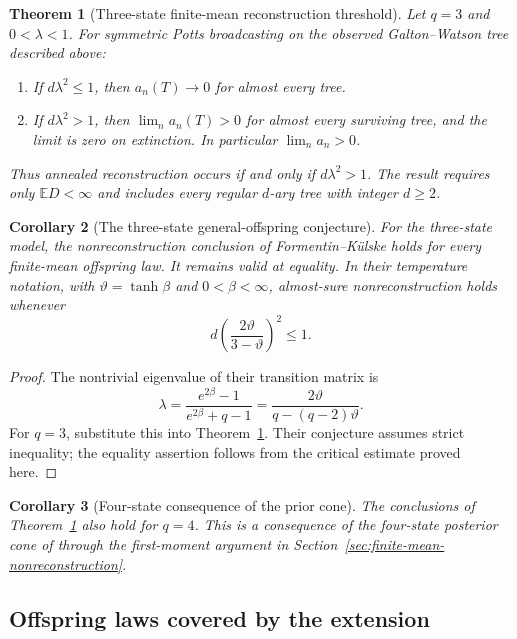 \documentclass[11pt,reqno]{amsart}
\newtheorem{theorem}{Theorem}[section]
\newtheorem{corollary}[theorem]{Corollary}
\theoremstyle{definition}
\theoremstyle{remark}
\newcommand{\E}{\mathbb E}
\begin{document}
\begin{theorem}[Three-state finite-mean reconstruction threshold]\label{thm:main}
Let $q=3$ and $0<\lambda<1$. For symmetric Potts broadcasting on the observed Galton--Watson tree described above:
\begin{enumerate}
\item If $d\lambda^2\le1$, then $a_n(T)\to0$ for almost every tree.
\item If $d\lambda^2>1$, then $\lim_n a_n(T)>0$ for almost every surviving tree, and the limit is zero on extinction. In particular $\lim_n a_n>0$.
\end{enumerate}
Thus annealed reconstruction occurs if and only if $d\lambda^2>1$. The result requires only $\E D<\infty$ and includes every regular $d$-ary tree with integer $d\ge2$.
\end{theorem}

\begin{corollary}[The three-state general-offspring conjecture]\label{cor:fk}
For the three-state model, the nonreconstruction conclusion of Formentin--K\"ulske \cite[Conjecture 2.13]{FK2009} holds for every finite-mean offspring law. It remains valid at equality. In their temperature notation, with $\vartheta=\tanh\beta$ and $0<\beta<\infty$, almost-sure nonreconstruction holds whenever
\[
 d\left(\frac{2\vartheta}{3-\vartheta}\right)^2\le1.
\]
\end{corollary}

\begin{proof}
The nontrivial eigenvalue of their transition matrix is
\[
 \lambda=\frac{e^{2\beta}-1}{e^{2\beta}+q-1}
       =\frac{2\vartheta}{q-(q-2)\vartheta}.
\]
For $q=3$, substitute this into Theorem~\ref{thm:main}. Their conjecture assumes strict inequality; the equality assertion follows from the critical estimate proved here.
\end{proof}

\begin{corollary}[Four-state consequence of the prior cone]\label{cor:q4-prior}
The conclusions of Theorem~\ref{thm:main} also hold for $q=4$. This is a consequence of the four-state posterior cone of \cite[Proposition 3.2]{OpenAI4} through the first-moment argument in Section~\ref{sec:finite-mean-nonreconstruction}.
\end{corollary}

\subsection{Offspring laws covered by the extension}
\end{document}
